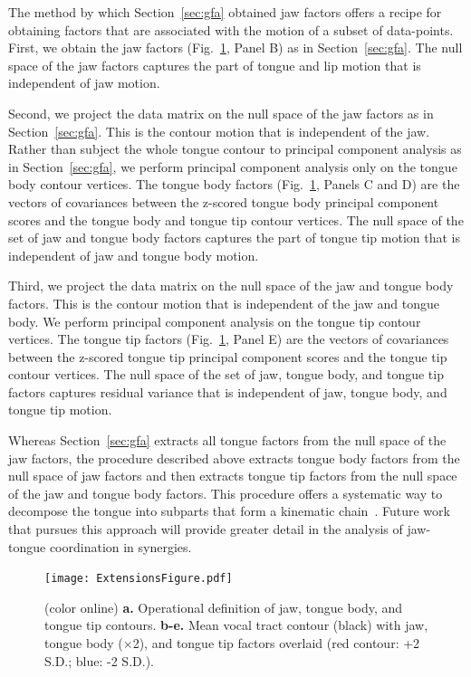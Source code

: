 \documentclass[preprint]{JASAnew}\usepackage[]{graphicx}\usepackage[]{color}
\begin{document}
The method by which Section~\ref{sec:gfa} obtained jaw factors offers a recipe for obtaining factors that are associated with the motion of a subset of data-points. 
First, we obtain the jaw factors (Fig.~\ref{fig:extensionsfigure}, Panel B) as in Section~\ref{sec:gfa}.
The null space of the jaw factors captures the part of tongue and lip motion that is independent of jaw motion. 

Second, we project the data matrix on the null space of the jaw factors as in Section~\ref{sec:gfa}. This is the contour motion that is independent of the jaw.
Rather than subject the whole tongue contour to principal component analysis as in Section~\ref{sec:gfa}, we perform principal component analysis only on the tongue body contour vertices.
The tongue body factors (Fig.~\ref{fig:extensionsfigure}, Panels C and D) are the vectors of covariances between the z-scored tongue body principal component scores and the tongue body and tongue tip contour vertices.
The null space of the set of jaw and tongue body factors captures the part of tongue tip motion that is independent of jaw and tongue body motion.

Third, we project the data matrix on the null space of the jaw and tongue body factors. This is the contour motion that is independent of the jaw and tongue body.
We perform principal component analysis on the tongue tip contour vertices.
The tongue tip factors (Fig.~\ref{fig:extensionsfigure}, Panel E) are the vectors of covariances between the z-scored tongue tip principal component scores and the tongue tip contour vertices.
The null space of the set of jaw, tongue body, and tongue tip factors captures residual variance that is independent of jaw, tongue body, and tongue tip motion.

Whereas Section~\ref{sec:gfa} extracts all tongue factors from the null space of the jaw factors, the procedure described above extracts tongue body factors from the null space of jaw factors and then extracts tongue tip factors from the null space of the jaw and tongue body factors.
This procedure offers a systematic way to decompose the tongue into subparts that form a kinematic chain~\cite{craig2005introduction}. Future work that pursues this approach will provide greater detail in the analysis of jaw-tongue coordination in synergies.

\begin{figure}

\texttt{[image: ExtensionsFigure.pdf]}

\caption{(color online) {\bf a.} Operational definition of jaw, tongue body, and tongue tip contours.
{\bf b-e.} Mean vocal tract contour (black) with jaw, tongue body ($\times$\num{2}), and tongue tip factors overlaid (red contour: +\num{2} S.D.; blue: -\num{2} S.D.).}
\label{fig:extensionsfigure}
\end{figure}
\end{document}
